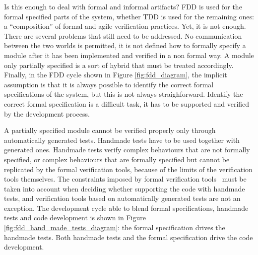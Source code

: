 \documentclass[english]{lni}
\begin{document}
Is this enough to deal with formal and informal artifacts?
FDD is used for the formal specified parts of the system, whether TDD is used for the remaining ones: a ``composition'' of formal and agile verification practices.
Yet, it is not enough.
There are several problems that still need to be addressed.
No communication between the two worlds is permitted, it is not defined how to formally specify a module after it has been implemented and verified in a non formal way.
A module only partially specified is a sort of hybrid that must be treated accordingly.
Finally, in the FDD cycle shown in Figure \ref{fig:fdd_diagram}, the implicit assumption is that it is always possible to identify the correct formal specifications of the system, but this is not always straighforward.
Identify the correct formal specification is a difficult task, it has to be supported and verified by the development process.

A partially specified module cannot be verified properly only through automatically generated tests.
Handmade tests have to be used together with generated ones.
Handmade tests verify complex behaviours that are not formally specified, or complex behaviours that are formally specified but cannot be replicated by the formal verification tools, because of the limits of the verification tools themselves. 
The constraints imposed by formal verification tools~\cite{Glass2002} must be taken into account when deciding whether supporting the code with handmade tests, and verification tools based on automatically generated tests are not an exception.
The development cycle able to blend formal specifications, handmade tests and code development is shown in Figure \ref{fig:fdd_hand_made_tests_diagram}: the formal specification drives the handmade tests. 
Both handmade tests and the formal specification drive the code development.
\end{document}
